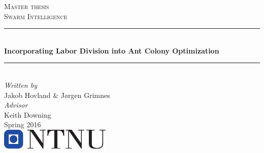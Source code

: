 
\begin{titlepage}

\newcommand{\HRule}{\rule{\linewidth}{0.5mm}} %

\center %
 


\textsc{\Large Master thesis}\\[0.5cm] %
\textsc{\large Swarm Intelligence}\\[1cm] %


\HRule \\[0.4cm]
{ \huge \bfseries Incorporating Labor Division into Ant Colony Optimization}\\[0.4cm] %
\HRule \\[1cm]
 

 \emph{Written by}\\
 Jakob Hovland \& Jørgen Grimnes\\[0.5cm]

 \emph{Advisor}\\
Keith Downing \\[5cm]




{\large Spring 2016}\\

\vfill %
\includegraphics[width=200px]{logo.pdf}\\ %
 


\end{titlepage}